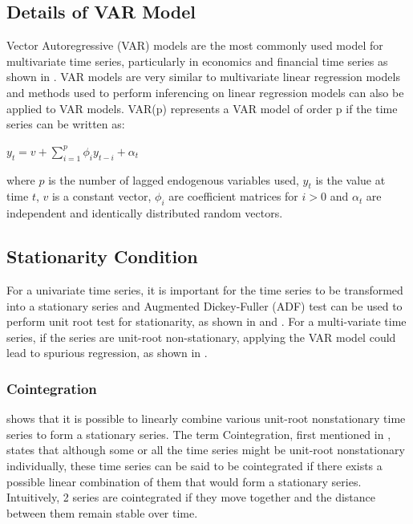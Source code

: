 \documentclass[12pt, letterpaper] {article}
\begin{document}
\subsection{Details of VAR Model}
Vector Autoregressive (VAR) models are the most commonly used model for multivariate time series, particularly in economics and financial time series as shown in \cite{Hilde2000}. VAR models are very similar to multivariate linear regression models and methods used to perform inferencing on linear regression models can also be applied to VAR models. VAR(p) represents a VAR model of order p if the time series can be written as: 

\begin{center}
    $\displaystyle y_t=v+\sum_{i=1}^{p} \phi_{i}y_{t-i}+\alpha_t$
\end{center}

\noindent where $p$ is the number of lagged endogenous variables used, $y_t$ is the value at time $t$, $v$ is a constant vector, $\phi_i$ are coefficient matrices for $i>0$ and $\alpha_t$ are independent and identically distributed random vectors. 

\subsection{Stationarity Condition}
For a univariate time series, it is important for the time series to be transformed into a stationary series and Augmented Dickey-Fuller (ADF) test can be used to perform unit root test for stationarity, as shown in \cite{Zhijie1998} and \cite{Rizwan2011}. For a multi-variate time series, if the series are unit-root non-stationary, applying the VAR model could lead to spurious regression, as shown in \cite{Baumohl2009}.  

\subsubsection{Cointegration}
\cite{Box1977} shows that it is possible to linearly combine various unit-root nonstationary time series to form a stationary series. The term Cointegration, first mentioned in \cite{Granger1983}, states that although some or all the time series might be unit-root nonstationary individually, these time series can be said to be cointegrated if there exists a possible linear combination of them that would form a stationary series. Intuitively, 2 series are cointegrated if they move together and the distance between them remain stable over time. 
\end{document}
